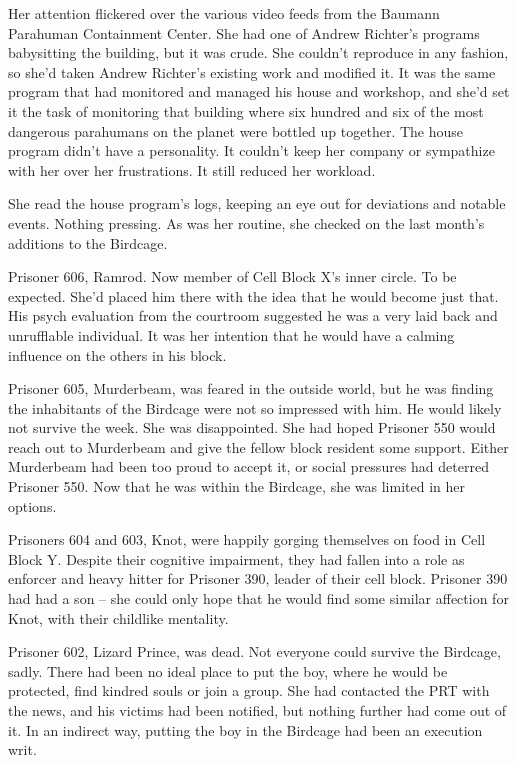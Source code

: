 Her attention flickered over the various video feeds from the Baumann Parahuman Containment Center.  She had one of Andrew Richter's programs babysitting the building, but it was crude.  She couldn't reproduce in any fashion, so she'd taken Andrew Richter's existing work and modified it. It was the same program that had monitored and managed his house and workshop, and she'd set it the task of monitoring that building where six hundred and six of the most dangerous parahumans on the planet were bottled up together.  The house program didn't have a personality.  It couldn't keep her company or sympathize with her over her frustrations.  It still reduced her workload.



She read the house program's logs, keeping an eye out for deviations and notable events.  Nothing pressing.  As was her routine, she checked on the last month's additions to the Birdcage.



Prisoner 606, Ramrod.  Now member of Cell Block X's inner circle.  To be expected.  She'd placed him there with the idea that he would become just that.  His psych evaluation from the courtroom suggested he was a very laid back and unrufflable individual.  It was her intention that he would have a calming influence on the others in his block.



Prisoner 605, Murderbeam, was feared in the outside world, but he was finding the inhabitants of the Birdcage were not so impressed with him.  He would likely not survive the week.  She was disappointed.  She had hoped Prisoner 550 would reach out to Murderbeam and give the fellow block resident some support.  Either Murderbeam had been too proud to accept it, or social pressures had deterred Prisoner 550.  Now that he was within the Birdcage, she was limited in her options.



Prisoners 604 and 603, Knot, were happily gorging themselves on food in Cell Block Y.  Despite their cognitive impairment, they had fallen into a role as enforcer and heavy hitter for Prisoner 390, leader of their cell block.  Prisoner 390 had had a son – she could only hope that he would find some similar affection for Knot, with their childlike mentality.



Prisoner 602, Lizard Prince, was dead.  Not everyone could survive the Birdcage, sadly.  There had been no ideal place to put the boy, where he would be protected, find kindred souls or join a group.  She had contacted the PRT with the news, and his victims had been notified, but nothing further had come out of it.  In an indirect way, putting the boy in the Birdcage had been an execution writ.



